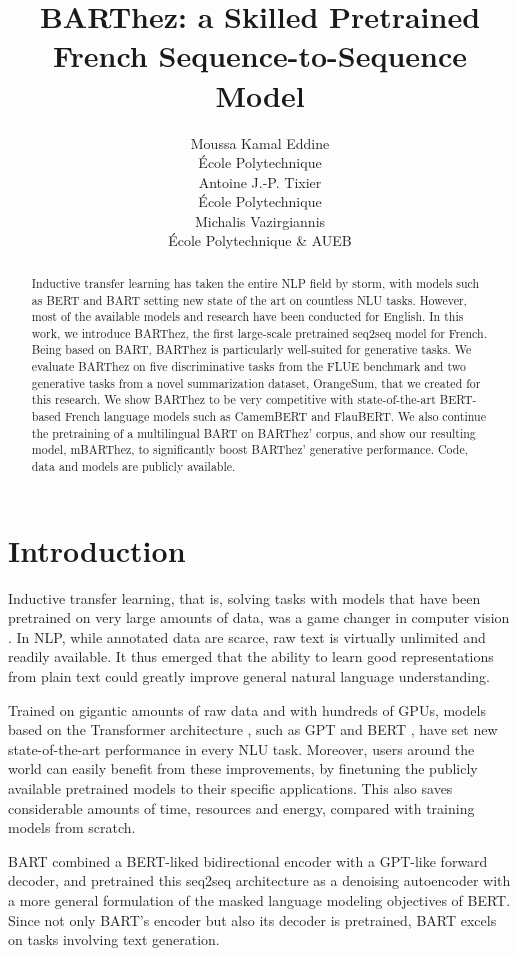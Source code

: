 \documentclass[11pt,a4paper]{article}
\title{BARThez: a Skilled Pretrained French Sequence-to-Sequence Model}
\author{Moussa Kamal Eddine \\
  École Polytechnique \\
  \And
  Antoine J.-P. Tixier \\
  École Polytechnique \\\And
  Michalis Vazirgiannis \\
  École Polytechnique \& AUEB \\}
\date{}
\begin{document}
\maketitle

\begin{abstract}
Inductive transfer learning has taken the entire NLP field by storm, with models such as BERT and BART setting new state of the art on countless NLU tasks.
However, most of the available models and research have been conducted for English.
In this work, we introduce BARThez, the first large-scale pretrained seq2seq model for French.
Being based on BART, BARThez is particularly well-suited for generative tasks.
We evaluate BARThez on five discriminative tasks from the FLUE benchmark and two generative tasks from a novel summarization dataset, OrangeSum, that we created for this research. 
We show BARThez to be very competitive with state-of-the-art BERT-based French language models such as CamemBERT and FlauBERT.
We also continue the pretraining of a multilingual BART on BARThez' corpus, and show our resulting model, mBARThez, to significantly boost BARThez' generative performance.
Code, data and models are publicly available.
\end{abstract}

\section{Introduction}
Inductive transfer learning, that is, solving tasks with models that have been pretrained on very large amounts of data, was a game changer in computer vision \cite{krizhevsky2012imagenet}.
In NLP, while annotated data are scarce, raw text is virtually unlimited and readily available.
It thus emerged that the ability to learn good representations from plain text could greatly improve general natural language understanding.

Trained on gigantic amounts of raw data and with hundreds of GPUs, models based on the Transformer architecture \cite{vaswani2017attention}, such as GPT \cite{radford2018improving} and BERT \cite{devlin2018bert}, have set new state-of-the-art performance in every NLU task.
Moreover, users around the world can easily benefit from these improvements, by finetuning the publicly available pretrained models to their specific applications.
This also saves considerable amounts of time, resources and energy, compared with training models from scratch.

BART \cite{lewis2019bart} combined a BERT-liked bidirectional encoder with a GPT-like forward decoder, and pretrained this seq2seq architecture as a denoising autoencoder with a more general formulation of the masked language modeling objectives of BERT.
Since not only BART's encoder but also its decoder is pretrained, BART excels on tasks involving text generation.
\end{document}
